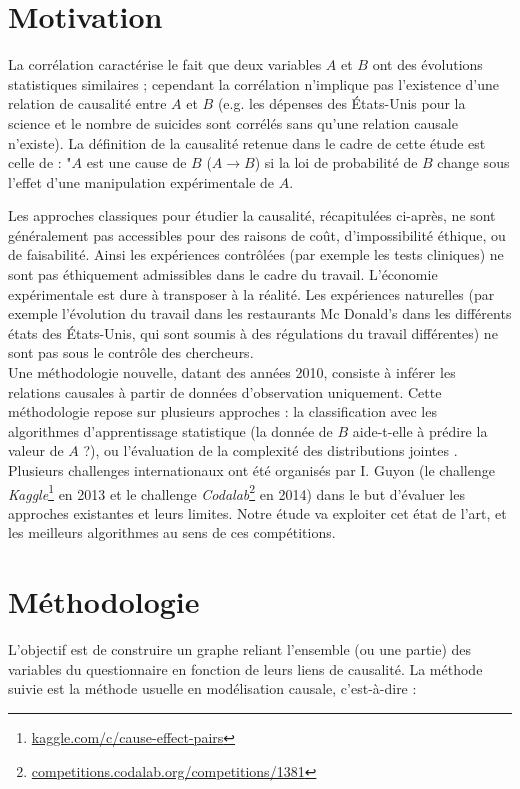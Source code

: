 \documentclass[11pt,fleqn,openany,frenchb]{book} %
\begin{document}
\section{Motivation}
La corrélation caractérise le fait que deux variables $A$ et $B$ ont des évolutions statistiques similaires ; cependant la corrélation n'implique pas l'existence d'une relation de causalité entre $A$ et $B$ (e.g. les dépenses des \'Etats-Unis pour la  science et le nombre de suicides sont corrélés sans qu'une relation causale n'existe). La définition de la causalité retenue dans le cadre de cette étude est celle de \cite{statnikov2012new} : "$A$ est une cause de $B$ ($A \rightarrow B$) si la loi de probabilité de $B$ change sous l'effet d'une manipulation expérimentale de $A$. \par
Les approches classiques pour étudier la causalité, récapitulées ci-après, ne sont généralement pas accessibles pour des raisons de coût, d'impossibilité éthique, ou de faisabilité. Ainsi les expériences contrôlées (par exemple les tests cliniques) ne sont pas éthiquement admissibles dans le cadre du travail. L'économie expérimentale est dure à transposer à la réalité. Les expériences naturelles (par exemple l'évolution du travail dans les restaurants Mc Donald's dans les différents états des \'Etats-Unis, qui sont soumis à des régulations du travail différentes) ne sont pas sous le contrôle des chercheurs.\\
Une méthodologie nouvelle, datant des années 2010, consiste à inférer les relations causales à partir de données d'observation uniquement. Cette méthodologie repose sur plusieurs approches : la classification avec les algorithmes d'apprentissage statistique (la donnée de $B$ aide-t-elle à prédire la valeur de $A$ ?), ou l'évaluation de la complexité des distributions jointes \cite{stegle2010probabilistic}. Plusieurs challenges internationaux ont été organisés par I. Guyon (le challenge \textit{Kaggle}\footnote{\href{https://www.kaggle.com/c/cause-effect-pairs}{kaggle.com/c/cause-effect-pairs}} en 2013 et le challenge  \textit{Codalab}\footnote{\href{https://competitions.codalab.org/competitions/1381}{competitions.codalab.org/competitions/1381}} en 2014) dans le but d'évaluer les approches existantes et leurs limites. Notre étude va exploiter cet état de l'art, et les meilleurs algorithmes au sens de ces compétitions. 

\section{Méthodologie}
L'objectif est de construire un graphe reliant l'ensemble (ou une partie) des variables du questionnaire en fonction de leurs liens de causalité. La méthode suivie est la méthode usuelle en modélisation causale, c'est-à-dire :
\end{document}

